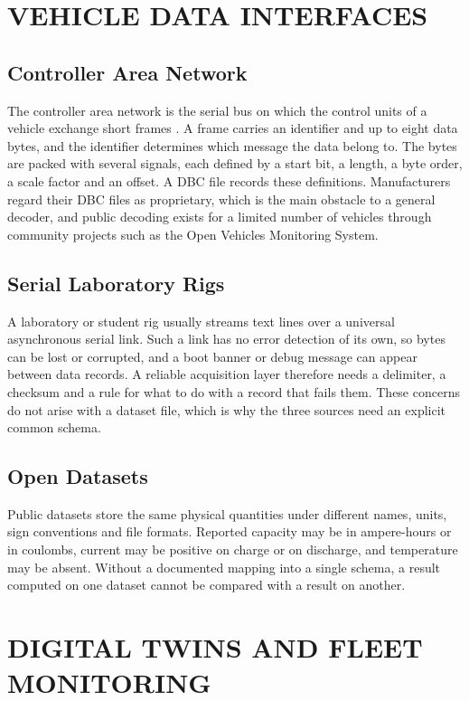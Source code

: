 \section{VEHICLE DATA INTERFACES}

\subsection{Controller Area Network}

The controller area network is the serial bus on which the control units of a vehicle exchange short frames \cite{iso11898}. A frame carries an identifier and up to eight data bytes, and the identifier determines which message the data belong to. The bytes are packed with several signals, each defined by a start bit, a length, a byte order, a scale factor and an offset. A DBC file records these definitions. Manufacturers regard their DBC files as proprietary, which is the main obstacle to a general decoder, and public decoding exists for a limited number of vehicles through community projects such as the Open Vehicles Monitoring System.

\subsection{Serial Laboratory Rigs}

A laboratory or student rig usually streams text lines over a universal asynchronous serial link. Such a link has no error detection of its own, so bytes can be lost or corrupted, and a boot banner or debug message can appear between data records. A reliable acquisition layer therefore needs a delimiter, a checksum and a rule for what to do with a record that fails them. These concerns do not arise with a dataset file, which is why the three sources need an explicit common schema.

\subsection{Open Datasets}

Public datasets store the same physical quantities under different names, units, sign conventions and file formats. Reported capacity may be in ampere-hours or in coulombs, current may be positive on charge or on discharge, and temperature may be absent. Without a documented mapping into a single schema, a result computed on one dataset cannot be compared with a result on another.

\section{DIGITAL TWINS AND FLEET MONITORING}

